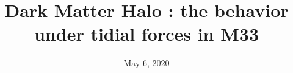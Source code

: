 \documentclass{aastex63}
\date{May 6, 2020}
\begin{document}
\title{Dark Matter Halo : the behavior under tidial forces in M33 }


\end{document}
